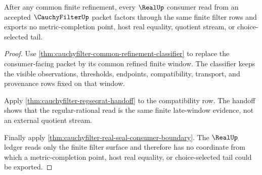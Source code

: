 \begin{theorem}\label{thm:cauchyfilter-real-seal-refinement-exhaustion}
After any common finite refinement, every $\RealUp$ consumer read from an
accepted $\CauchyFilterUp$ packet factors through the same finite filter rows
and exports no metric-completion point, host real equality, quotient stream, or
choice-selected tail.
\end{theorem}
\begin{proof}
Use \autoref{thm:cauchyfilter-common-refinement-classifier} to replace the
consumer-facing packet by its common refined finite window. The classifier
keeps the visible observations, thresholds, endpoints, compatibility,
transport, and provenance rows fixed on that window.

Apply \autoref{thm:cauchyfilter-regseqrat-handoff} to the compatibility row.
The handoff shows that the regular-rational read is the same finite late-window
evidence, not an external quotient stream.

Finally apply \autoref{thm:cauchyfilter-real-seal-consumer-boundary}. The
$\RealUp$ ledger reads only the finite filter surface and therefore has no
coordinate from which a metric-completion point, host real equality, or
choice-selected tail could be exported.
\end{proof}

